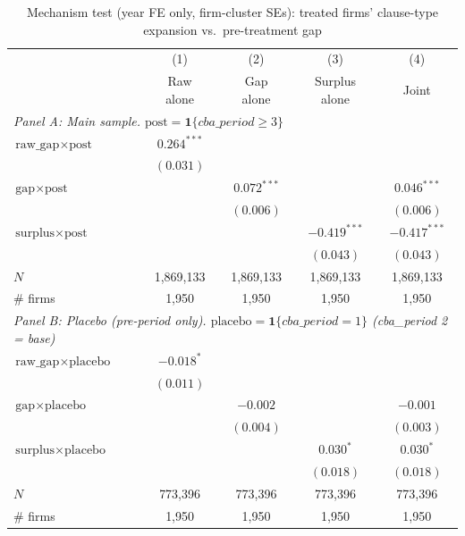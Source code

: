 \begin{table}[H]
\centering
\caption{Mechanism test (year FE only, firm-cluster SEs): treated firms' clause-type expansion vs.\ pre-treatment gap}
\label{tab:mechanism_test_yearonly_firmcluster}
\scriptsize
\begin{tabular}{lcccc}
\toprule\toprule
 & (1) & (2) & (3) & (4) \\
 & \shortstack{Raw \\ alone} & \shortstack{Gap \\ alone} & \shortstack{Surplus \\ alone} & Joint \\
\midrule
\multicolumn{5}{l}{\textit{Panel A: Main sample. $\text{post} = \mathbf{1}\{cba\_period \geq 3\}$}} \\
\midrule
$\text{raw\_gap} \times \text{post}$ & $0.264^{***}$ &  &  &  \\
 & $(0.031)$ &  &  &  \\
$\text{gap} \times \text{post}$ &  & $0.072^{***}$ &  & $0.046^{***}$ \\
 &  & $(0.006)$ &  & $(0.006)$ \\
$\text{surplus} \times \text{post}$ &  &  & $-0.419^{***}$ & $-0.417^{***}$ \\
 &  &  & $(0.043)$ & $(0.043)$ \\
$N$ & 1,869,133 & 1,869,133 & 1,869,133 & 1,869,133 \\
\# firms & 1,950 & 1,950 & 1,950 & 1,950 \\
\midrule
\multicolumn{5}{l}{\textit{Panel B: Placebo (pre-period only). $\text{placebo} = \mathbf{1}\{cba\_period = 1\}$ (cba\_period 2 = base)}} \\
\midrule
$\text{raw\_gap} \times \text{placebo}$ & $-0.018^{*}$ &  &  &  \\
 & $(0.011)$ &  &  &  \\
$\text{gap} \times \text{placebo}$ &  & $-0.002$ &  & $-0.001$ \\
 &  & $(0.004)$ &  & $(0.003)$ \\
$\text{surplus} \times \text{placebo}$ &  &  & $0.030^{*}$ & $0.030^{*}$ \\
 &  &  & $(0.018)$ & $(0.018)$ \\
$N$ & 773,396 & 773,396 & 773,396 & 773,396 \\
\# firms & 1,950 & 1,950 & 1,950 & 1,950 \\
\bottomrule
\end{tabular}
\begin{minipage}{\linewidth}
\footnotesize\vspace{4pt}

\end{minipage}
\end{table}
